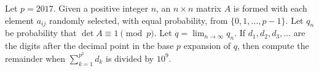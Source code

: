 Let $p = 2017$. Given a positive integer $n$, an $n\times n$ matrix $A$ is formed with each element $a_{ij}$ randomly selected, with equal probability, from $\{0, 1, \ldots, p - 1\}$. Let $q_n$ be probability that $\det A\equiv 1\pmod{p}$. Let $q=\displaystyle\lim_{n\rightarrow\infty} q_n$. If $d_1, d_2, d_3, \ldots$ are the digits after the decimal point in the base $p$ expansion of $q$, then compute the remainder when $\displaystyle\sum_{k = 1}^{p^2} d_k$ is divided by $10^9$.
